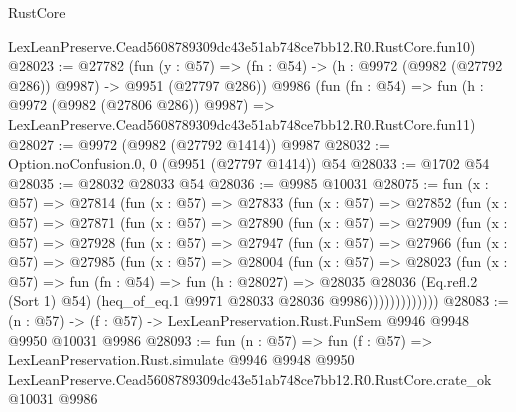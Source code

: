 \begin{lexlean}{RustCore}
\begin{coremodule}
    LexLeanPreserve.Cead5608789309dc43e51ab748ce7bb12.R0.RustCore.fun10)
@28023 := @27782
    (fun (y : @57) => (fn : @54) -> (h : @9972 (@9982 (@27792 @286)) @9987) -> @9951 (@27797 @286))
    @9986
    (fun (fn : @54) =>
    fun (h : @9972 (@9982 (@27806 @286)) @9987) =>
    LexLeanPreserve.Cead5608789309dc43e51ab748ce7bb12.R0.RustCore.fun11)
@28027 := @9972 (@9982 (@27792 @1414)) @9987
@28032 := Option.noConfusion.{0, 0} (@9951 (@27797 @1414)) @54
@28033 := @1702 @54
@28035 := @28032 @28033 @54
@28036 := @9985 @10031
@28075 := fun (x : @57) =>
  @27814
    (fun (x : @57) =>
    @27833
      (fun (x : @57) =>
      @27852
        (fun (x : @57) =>
        @27871
          (fun (x : @57) =>
          @27890
            (fun (x : @57) =>
            @27909
              (fun (x : @57) =>
              @27928
                (fun (x : @57) =>
                @27947
                  (fun (x : @57) =>
                  @27966
                    (fun (x : @57) =>
                    @27985
                      (fun (x : @57) =>
                      @28004
                        (fun (x : @57) =>
                        @28023
                          (fun (x : @57) =>
                          fun (fn : @54) =>
                          fun (h : @28027) =>
                          @28035
                            @28036
                            (Eq.refl.{2} (Sort 1) @54)
                            (heq_of_eq.{1} @9971 @28033 @28036 @9986)))))))))))))
@28083 := (n : @57) -> (f : @57) -> LexLeanPreservation.Rust.FunSem @9946 @9948 @9950 @10031 @9986
@28093 := fun (n : @57) =>
  fun (f : @57) =>
  LexLeanPreservation.Rust.simulate
    @9946
    @9948
    @9950
    LexLeanPreserve.Cead5608789309dc43e51ab748ce7bb12.R0.RustCore.crate_ok
    @10031
    @9986
\end{coremodule}
\end{lexlean}
